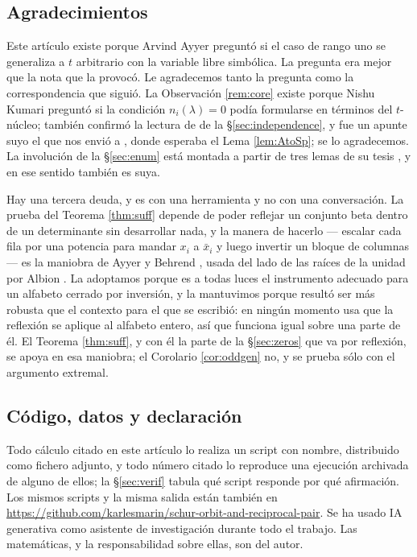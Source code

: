 \documentclass[11pt,reqno]{amsart}
\theoremstyle{plain}
\theoremstyle{definition}
\begin{document}
\subsection*{Agradecimientos}
Este artículo existe porque Arvind Ayyer preguntó si el caso de rango uno se generaliza a $t$
arbitrario con la variable libre simbólica. La pregunta era mejor que la nota que la provocó. Le
agradecemos tanto la pregunta como la correspondencia que siguió. La Observación \ref{rem:core} existe
porque Nishu Kumari preguntó si la condición $n_i(\lambda)=0$ podía formularse en términos del
$t$-núcleo; también confirmó la lectura de \cite[Teorema 5.3]{AK25} de la \S\ref{sec:independence}, y
fue un apunte suyo el que nos envió a \cite[\S3]{AK25}, donde esperaba el Lema \ref{lem:AtoSp}; se lo
agradecemos. La involución de la
\S\ref{sec:enum} está montada a partir de tres lemas de su tesis \cite{KumariThesis}, y en ese
sentido también es suya.

Hay una tercera deuda, y es con una herramienta y no con una conversación. La prueba del Teorema
\ref{thm:suff} depende de poder reflejar un conjunto beta dentro de un determinante sin desarrollar
nada, y la manera de hacerlo --- escalar cada fila por una potencia para mandar $x_i$ a $\bar x_i$ y
luego invertir un bloque de columnas --- es la maniobra de Ayyer y Behrend \cite[\S3]{AB19}, usada del
lado de las raíces de la unidad por Albion \cite{Alb23,Alb25}. La adoptamos porque es a todas luces
el instrumento adecuado para un alfabeto cerrado por inversión, y la mantuvimos porque resultó ser
más robusta que el contexto para el que se escribió: en ningún momento usa que la reflexión se
aplique al alfabeto entero, así que funciona igual sobre una parte de él. El Teorema
\ref{thm:suff}, y con él la parte de la \S\ref{sec:zeros} que va por reflexión, se apoya en
esa maniobra; el Corolario \ref{cor:oddgen} no, y se prueba sólo con el argumento extremal.

\subsection*{Código, datos y declaración}\label{sec:disclosure}\label{sec:disclosure}
Todo cálculo citado en este artículo lo realiza un script con nombre, distribuido como fichero
adjunto, y todo número citado lo reproduce una ejecución archivada de alguno de ellos; la
\S\ref{sec:verif} tabula qué script responde por qué afirmación. Los mismos scripts y la misma salida
están también en \url{https://github.com/karlesmarin/schur-orbit-and-reciprocal-pair}. Se ha usado IA
generativa como asistente de investigación durante todo el trabajo. Las matemáticas, y la
responsabilidad sobre ellas, son del autor.
\end{document}
